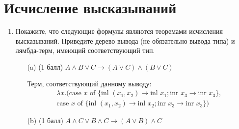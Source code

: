\section{Исчисление высказываний}
\begin{enumerate}
  \item Покажите, что следующие формулы являются теоремами исчисления высказываний. Приведите дерево вывода (не обязательно вывода типа) и лямбда-терм, имеющий соответствующий тип.
  \begin{itemize}
    \item[(a)] (1 балл) $A \land B \lor C \rightarrow (A \lor C) \land (B \lor C)$
    \begin{solution}
      \hspace{0.01cm}
      \begin{prooftree}
      \end{prooftree}
      Терм, соответствующий данному выводу:
      \begin{eqnarray}
        \lambda x. (\text{case } x \text{ of } \{\text{inl } (x_1, x_2) \rightarrow \text{inl } x_1; \text{inr } x_3 \rightarrow \text{inr } x_3\}, \\
        \text{case } x \text{ of } \{\text{inl } (x_1, x_2) \rightarrow \text{inl } x_2; \text{inr } x_3 \rightarrow \text{inr } x_3\})
      \end{eqnarray}
    \end{solution}
    \item[(b)] (1 балл) $A \land C \lor B \land C \rightarrow (A \lor B) \land C$
    \begin{solution}
      \hspace{0.01cm}
      \begin{prooftree}

\end{prooftree}
\end{solution}
\end{itemize}
\end{enumerate}
